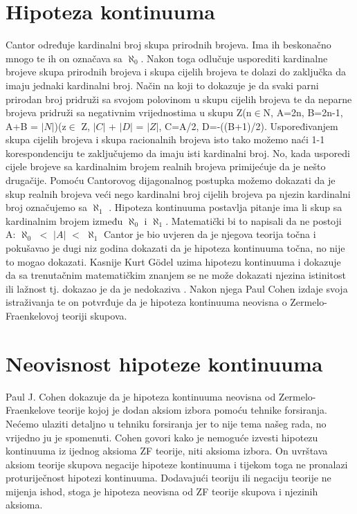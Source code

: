 \documentclass[12pt]{report}
\begin{document}
\section{Hipoteza kontinuuma}
Cantor određuje kardinalni broj skupa prirodnih brojeva. Ima ih beskonačno mnogo te ih on označava sa $\aleph_0$. Nakon toga odlučuje usporediti kardinalne brojeve skupa prirodnih brojeva i skupa cijelih brojeva te dolazi do zaključka da imaju jednaki kardinalni broj. Način na koji to dokazuje je da svaki parni prirodan broj pridruži sa svojom polovinom u skupu cijelih brojeva te da neparne brojeva pridruži sa negativnim vrijednostima u skupu Z(n$\in$N, A=2n, B=2n-1, A+B = $|N|$)(z$\in$ Z, $|C|$ + $|D|$ = $|Z|$, C=A/2, D=-((B+1)/2). Uspoređivanjem skupa cijelih brojeva i skupa racionalnih brojeva isto tako možemo naći 1-1 korespondenciju te zaključujemo da imaju isti kardinalni broj. No, kada usporedi cijele brojeve sa kardinalnim brojem realnih brojeva primijećuje da je nešto drugačije. Pomoću Cantorovog dijagonalnog postupka možemo dokazati da je skup realnih brojeva veći nego kardinalni broj cijelih brojeva pa njezin kardinalni broj označujemo sa $\aleph_1$ . Hipoteza kontinuuma postavlja pitanje ima li skup sa kardinalnim brojem između $\aleph_0$ i $\aleph_1$. Matematički bi to napisali da ne postoji A: $\aleph_0$ $<$ $|A|$ $<$ $\aleph_1$  Cantor je bio uvjeren da je njegova teorija točna i pokušavao je dugi niz godina dokazati da je hipoteza kontinuuma točna, no nije to mogao dokazati. Kasnije Kurt G\"{o}del uzima hipotezu kontinuuma i dokazuje da sa trenutačnim matematičkim znanjem se ne može dokazati njezina istinitost ili lažnost tj. dokazao je da je nedokaziva . Nakon njega Paul Cohen izdaje svoja istraživanja te on potvrđuje da je hipoteza kontinuuma neovisna o Zermelo-Fraenkelovoj teoriji skupova.

\section{Neovisnost hipoteze kontinuuma}
Paul J. Cohen dokazuje da je hipoteza kontinuuma neovisna od Zermelo-Fraenkelove teorije kojoj je dodan aksiom izbora pomoću tehnike forsiranja. Nećemo ulaziti detaljno u tehniku forsiranja jer to nije tema našeg rada, no vrijedno ju je spomenuti. Cohen govori kako je nemoguće izvesti hipotezu kontinuuma iz ijednog aksioma ZF teorije, niti aksioma izbora. On uvrštava aksiom teorije skupova negacije hipoteze kontinuuma i tijekom toga ne pronalazi proturiječnost hipotezi kontinuuma. Dodavajući teoriju ili negaciju teorije ne mijenja ishod, stoga je hipoteza neovisna od ZF teorije skupova i njezinih aksioma.
\end{document}
